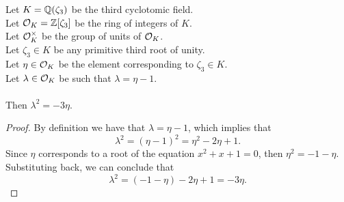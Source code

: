 \begin{lemma}
    \label{lmm:lambda_sq}
    \leanok
    Let $K = \mathbb{Q}(\zeta_3)$ be the third cyclotomic field. \\
    Let $\mathcal{O}_K = \mathbb{Z}[\zeta_3]$ be the ring of integers of $K$. \\
    Let $\mathcal{O}^\times_K$ be the group of units of $\mathcal{O}_K$. \\
    Let $\zeta_3 \in K$ be any primitive third root of unity. \\
    Let $\eta \in \mathcal{O}_K$ be the element corresponding to $\zeta_3 \in K$. \\
    Let $\lambda \in \mathcal{O}_K$ be such that $\lambda = \eta -1$. \\\\
    Then $\lambda^2 = -3 \eta$.
\end{lemma}
\begin{proof}
    \leanok
    By definition we have that $\lambda = \eta -1$, which implies that
    $$\lambda^2 = (\eta - 1)^2 = \eta^2 - 2\eta + 1.$$
    Since $\eta$ corresponds to a root of the equation $x^2 + x + 1 = 0$, then $\eta^2 = -1 - \eta$.
    Substituting back, we can conclude that
    $$\lambda^2 = (-1 - \eta) - 2\eta + 1 = -3\eta.$$
\end{proof}

